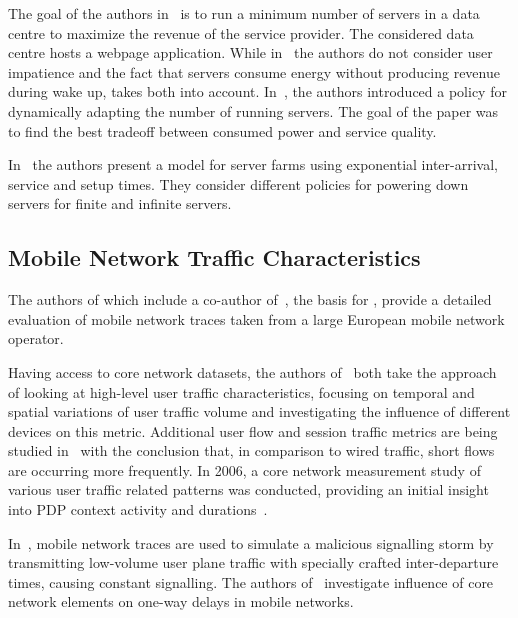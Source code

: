 The goal of the authors in~\cite{Mazzucco2010a, Dyachuk2010, Mazzucco2010b} is to run a minimum number of servers in a data centre to maximize the revenue of the service provider.
The considered data centre hosts a webpage application. While in~\cite{Mazzucco2010a} the authors do not consider user impatience and the fact that servers consume energy without producing revenue during wake up, \cite{Mazzucco2010b} takes both into account. In~\cite{Dyachuk2010}, the authors introduced a policy for dynamically adapting the number of running servers. The goal of the paper was to find the best tradeoff between consumed power and service quality.

In~\cite{Gandhi2010} the authors present a model for server farms using exponential inter-arrival, service and setup times. They consider different policies for powering down servers for finite and infinite servers. 


\subsection{Mobile Network Traffic Characteristics}
The authors of \cite{Metzger2014} which include a co-author of~\cite{Metzger2014a}, the basis for , provide a detailed evaluation of mobile network traces taken from a large European mobile network operator. 

Having access to core network datasets, the authors of~\cite{Shafiq2011, Paul2011} both take the approach of looking at high-level user traffic characteristics, focusing on temporal and spatial variations of user traffic volume and investigating the influence of different devices on this metric.
Additional user flow and session traffic metrics are being studied in~\cite{Zhang2012} with the conclusion that, in comparison to wired traffic, short flows are occurring more frequently.
In 2006, a core network measurement study of various user traffic related patterns was conducted, providing an initial insight into \gls{PDP} context activity and durations~\cite{Svoboda2006}.

In~\cite{Lee2007}, mobile network traces are used to simulate a malicious signalling storm by transmitting low-volume user plane traffic with specially crafted inter-departure times, causing constant signalling.
The authors of~\cite{Romirer-Maierhofer2008} investigate influence of core network elements on one-way delays in mobile networks.

